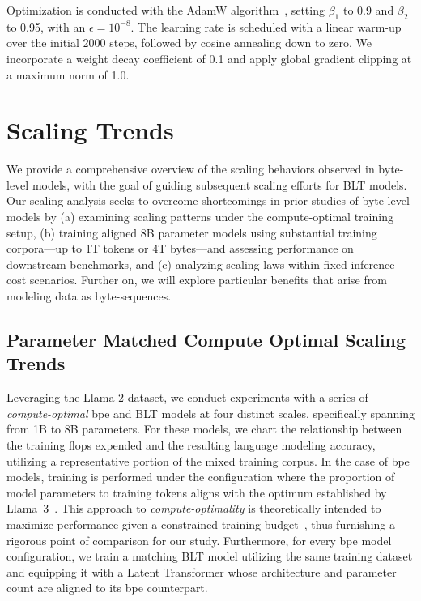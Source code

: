 Optimization is conducted with the AdamW algorithm~\citep{adamw}, setting $\beta_1$ to 0.9 and $\beta_2$ to 0.95, with an $\epsilon=10^{-8}$. The learning rate is scheduled with a linear warm-up over the initial 2000 steps, followed by cosine annealing down to zero. We incorporate a weight decay coefficient of 0.1 and apply global gradient clipping at a maximum norm of 1.0.

\section{Scaling Trends}
\label{section:scaling}

We provide a comprehensive overview of the scaling behaviors observed in byte-level models, with the goal of guiding subsequent scaling efforts for {\textsc BLT} models. Our scaling analysis seeks to overcome shortcomings in prior studies of byte-level models by (a) examining scaling patterns under the compute-optimal training setup, (b) training aligned 8B parameter models using substantial training corpora—up to 1T tokens or 4T bytes—and assessing performance on downstream benchmarks, and (c) analyzing scaling laws within fixed inference-cost scenarios. Further on, we will explore particular benefits that arise from modeling data as byte-sequences.

\subsection{Parameter Matched Compute Optimal Scaling Trends}
\label{section:parameter-matched-scaling}
Leveraging the Llama 2 dataset, we conduct experiments with a series of \textit{compute-optimal} bpe and {\textsc BLT} models at four distinct scales, specifically spanning from 1B to 8B parameters. For these models, we chart the relationship between the training flops expended and the resulting language modeling accuracy, utilizing a representative portion of the mixed training corpus. In the case of bpe models, training is performed under the configuration where the proportion of model parameters to training tokens aligns with the optimum established by Llama~3~\citep{dubey2024llama}. This approach to \textit{compute-optimality} is theoretically intended to maximize performance given a constrained training budget~\citep{hoffmann2022training}, thus furnishing a rigorous point of comparison for our study. Furthermore, for every bpe model configuration, we train a matching {\textsc BLT} model utilizing the same training dataset and equipping it with a Latent Transformer whose architecture and parameter count are aligned to its bpe counterpart.

